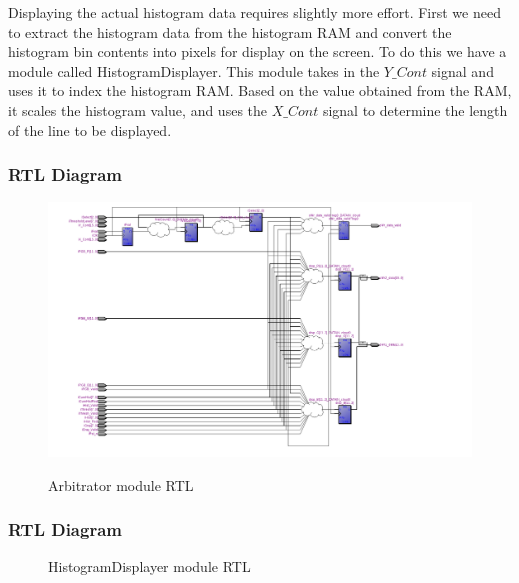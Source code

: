 \documentclass[12pt]{article}
\begin{document}
  Displaying the actual histogram data requires slightly more effort. First we need to extract the histogram data from the histogram RAM and convert the histogram bin contents into pixels for display on the screen. To do this we have a module called HistogramDisplayer. This module takes in the \(Y\_Cont\) signal and uses it to index the histogram RAM. Based on the value obtained from the RAM, it scales the histogram value, and uses the \(X\_Cont\) signal to determine the length of the line to be displayed. 
  \subsubsection{RTL Diagram}
    \begin{figure}[H]
    \begin{center}
        {\includegraphics[width=\textwidth]{Images/ArbitratorRTL.png}}
    \end{center}
    \caption{Arbitrator module RTL}
    \label{fig:arbitrator_rtl}
  \end{figure} 
  \subsubsection{RTL Diagram}
    \begin{figure}[H]
    \caption{HistogramDisplayer module RTL}
    \label{fig:histogram_displayer_rtl}
  \end{figure}
  
\end{document}

